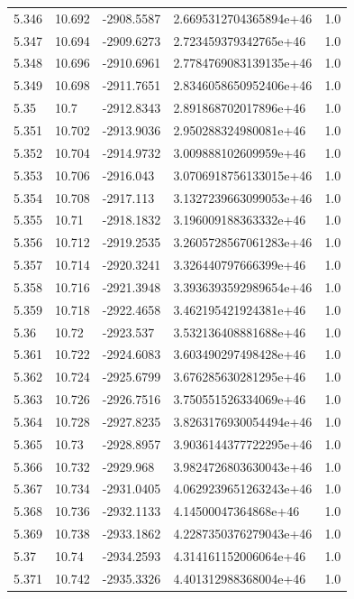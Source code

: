 \begin{tabular}{lllll}
5.346 & 10.692 & -2908.5587 & 2.6695312704365894e+46 & 1.0 \\
5.347 & 10.694 & -2909.6273 & 2.723459379342765e+46 & 1.0 \\
5.348 & 10.696 & -2910.6961 & 2.7784769083139135e+46 & 1.0 \\
5.349 & 10.698 & -2911.7651 & 2.8346058650952406e+46 & 1.0 \\
5.35 & 10.7 & -2912.8343 & 2.891868702017896e+46 & 1.0 \\
5.351 & 10.702 & -2913.9036 & 2.950288324980081e+46 & 1.0 \\
5.352 & 10.704 & -2914.9732 & 3.009888102609959e+46 & 1.0 \\
5.353 & 10.706 & -2916.043 & 3.0706918756133015e+46 & 1.0 \\
5.354 & 10.708 & -2917.113 & 3.1327239663099053e+46 & 1.0 \\
5.355 & 10.71 & -2918.1832 & 3.196009188363332e+46 & 1.0 \\
5.356 & 10.712 & -2919.2535 & 3.2605728567061283e+46 & 1.0 \\
5.357 & 10.714 & -2920.3241 & 3.326440797666399e+46 & 1.0 \\
5.358 & 10.716 & -2921.3948 & 3.3936393592989654e+46 & 1.0 \\
5.359 & 10.718 & -2922.4658 & 3.462195421924381e+46 & 1.0 \\
5.36 & 10.72 & -2923.537 & 3.532136408881688e+46 & 1.0 \\
5.361 & 10.722 & -2924.6083 & 3.603490297498428e+46 & 1.0 \\
5.362 & 10.724 & -2925.6799 & 3.676285630281295e+46 & 1.0 \\
5.363 & 10.726 & -2926.7516 & 3.750551526334069e+46 & 1.0 \\
5.364 & 10.728 & -2927.8235 & 3.8263176930054494e+46 & 1.0 \\
5.365 & 10.73 & -2928.8957 & 3.9036144377722295e+46 & 1.0 \\
5.366 & 10.732 & -2929.968 & 3.9824726803630043e+46 & 1.0 \\
5.367 & 10.734 & -2931.0405 & 4.0629239651263243e+46 & 1.0 \\
5.368 & 10.736 & -2932.1133 & 4.14500047364868e+46 & 1.0 \\
5.369 & 10.738 & -2933.1862 & 4.2287350376279043e+46 & 1.0 \\
5.37 & 10.74 & -2934.2593 & 4.314161152006064e+46 & 1.0 \\
5.371 & 10.742 & -2935.3326 & 4.401312988368004e+46 & 1.0 \\

\end{tabular}
